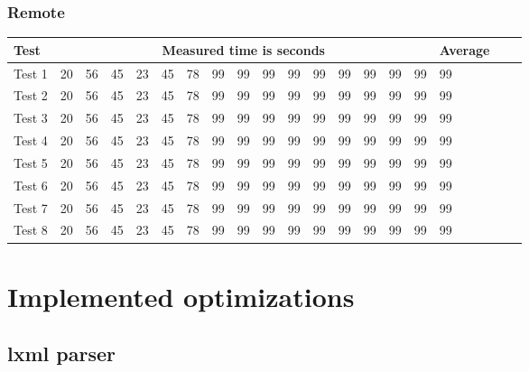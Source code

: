 \subsubsection{Remote}
\begin{center}
    \begin{tabular}{| l | l | l | l | l | l | l | l | l | l | l | l | l | l | l | l | l | l | l |}
    \hline
    Test & \multicolumn{15}{|c|}{Measured time is seconds} & Average \\ \hline
    Test 1 & 20 & 56 & 45 & 23 & 45 & 78 & 99 & 99 & 99 & 99 & 99 & 99 & 99 & 99 & 99 & 99 \\ \hline
    Test 2 & 20 & 56 & 45 & 23 & 45 & 78 & 99 & 99 & 99 & 99 & 99 & 99 & 99 & 99 & 99 & 99 \\ \hline
    Test 3 & 20 & 56 & 45 & 23 & 45 & 78 & 99 & 99 & 99 & 99 & 99 & 99 & 99 & 99 & 99 & 99 \\ \hline
    Test 4 & 20 & 56 & 45 & 23 & 45 & 78 & 99 & 99 & 99 & 99 & 99 & 99 & 99 & 99 & 99 & 99 \\ \hline
    Test 5 & 20 & 56 & 45 & 23 & 45 & 78 & 99 & 99 & 99 & 99 & 99 & 99 & 99 & 99 & 99 & 99 \\ \hline
    Test 6 & 20 & 56 & 45 & 23 & 45 & 78 & 99 & 99 & 99 & 99 & 99 & 99 & 99 & 99 & 99 & 99 \\ \hline
    Test 7 & 20 & 56 & 45 & 23 & 45 & 78 & 99 & 99 & 99 & 99 & 99 & 99 & 99 & 99 & 99 & 99 \\ \hline
    Test 8 & 20 & 56 & 45 & 23 & 45 & 78 & 99 & 99 & 99 & 99 & 99 & 99 & 99 & 99 & 99 & 99 \\ \hline
    \end{tabular}
\end{center}
\section{Implemented optimizations}
\subsection{lxml parser}
